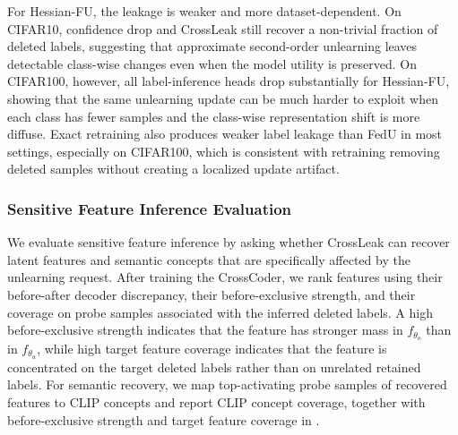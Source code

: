 For Hessian-FU, the leakage is weaker and more dataset-dependent. On CIFAR10, confidence drop and CrossLeak still recover a non-trivial fraction of deleted labels, suggesting that approximate second-order unlearning leaves detectable class-wise changes even when the model utility is preserved. On CIFAR100, however, all label-inference heads drop substantially for Hessian-FU, showing that the same unlearning update can be much harder to exploit when each class has fewer samples and the class-wise representation shift is more diffuse. Exact retraining also produces weaker label leakage than FedU in most settings, especially on CIFAR100, which is consistent with retraining removing deleted samples without creating a localized update artifact.




\subsubsection{Sensitive Feature Inference Evaluation}
We evaluate sensitive feature inference by asking whether CrossLeak can recover latent features and semantic concepts that are specifically affected by the unlearning request. After training the CrossCoder, we rank features using their before-after decoder discrepancy, their before-exclusive strength, and their coverage on probe samples associated with the inferred deleted labels. A high before-exclusive strength indicates that the feature has stronger mass in $f_{\theta_o}$ than in $f_{\theta_u}$, while high target feature coverage indicates that the feature is concentrated on the target deleted labels rather than on unrelated retained labels. For semantic recovery, we map top-activating probe samples of recovered features to CLIP concepts and report CLIP concept coverage, together with before-exclusive strength and target feature coverage in . 


